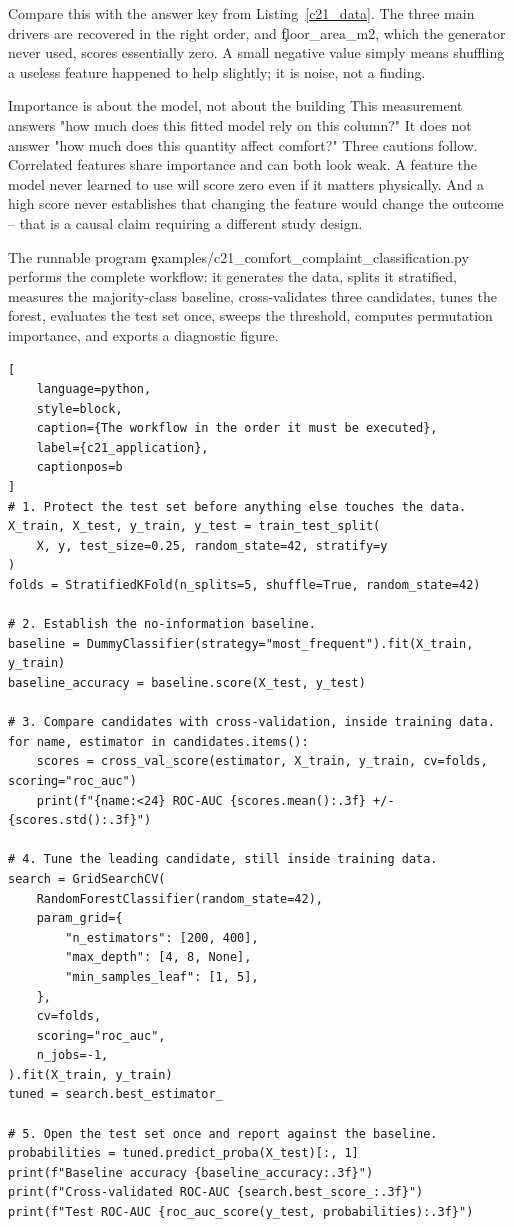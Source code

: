 Compare this with the answer key from Listing~\ref{c21_data}. The three main
drivers are recovered in the right order, and \c{floor_area_m2}, which the
generator never used, scores essentially zero. A small negative value simply
means shuffling a useless feature happened to help slightly; it is noise, not a
finding.

\begin{ExplainBox}{Importance is about the model, not about the building}
This measurement answers "how much does this fitted model rely on this column?"
It does not answer "how much does this quantity affect comfort?" Three cautions
follow. Correlated features share importance and can both look weak. A feature
the model never learned to use will score zero even if it matters physically.
And a high score never establishes that changing the feature would change the
outcome -- that is a causal claim requiring a different study design.
\end{ExplainBox}

\label{sec:c21-application}

The runnable program \c{examples/c21_comfort_complaint_classification.py}
performs the complete workflow: it generates the data, splits it stratified,
measures the majority-class baseline, cross-validates three candidates, tunes
the forest, evaluates the test set once, sweeps the threshold, computes
permutation importance, and exports a diagnostic figure.

\begin{lstlisting}[
    language=python,
    style=block,
    caption={The workflow in the order it must be executed},
    label={c21_application},
    captionpos=b
]
# 1. Protect the test set before anything else touches the data.
X_train, X_test, y_train, y_test = train_test_split(
    X, y, test_size=0.25, random_state=42, stratify=y
)
folds = StratifiedKFold(n_splits=5, shuffle=True, random_state=42)

# 2. Establish the no-information baseline.
baseline = DummyClassifier(strategy="most_frequent").fit(X_train, y_train)
baseline_accuracy = baseline.score(X_test, y_test)

# 3. Compare candidates with cross-validation, inside training data.
for name, estimator in candidates.items():
    scores = cross_val_score(estimator, X_train, y_train, cv=folds, scoring="roc_auc")
    print(f"{name:<24} ROC-AUC {scores.mean():.3f} +/- {scores.std():.3f}")

# 4. Tune the leading candidate, still inside training data.
search = GridSearchCV(
    RandomForestClassifier(random_state=42),
    param_grid={
        "n_estimators": [200, 400],
        "max_depth": [4, 8, None],
        "min_samples_leaf": [1, 5],
    },
    cv=folds,
    scoring="roc_auc",
    n_jobs=-1,
).fit(X_train, y_train)
tuned = search.best_estimator_

# 5. Open the test set once and report against the baseline.
probabilities = tuned.predict_proba(X_test)[:, 1]
print(f"Baseline accuracy {baseline_accuracy:.3f}")
print(f"Cross-validated ROC-AUC {search.best_score_:.3f}")
print(f"Test ROC-AUC {roc_auc_score(y_test, probabilities):.3f}")
\end{lstlisting}

